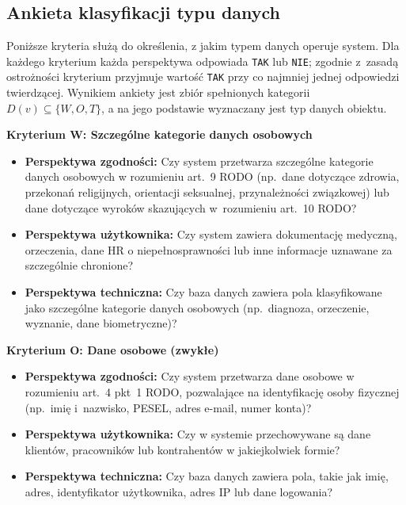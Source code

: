 \subsection{Ankieta klasyfikacji typu danych}

Poniższe kryteria służą do określenia, z jakim typem danych operuje system. Dla każdego kryterium każda perspektywa odpowiada \texttt{TAK} lub \texttt{NIE}; zgodnie z~zasadą ostrożności kryterium przyjmuje wartość \texttt{TAK} przy co najmniej jednej odpowiedzi twierdzącej. Wynikiem ankiety jest zbiór spełnionych kategorii $D(v) \subseteq \{W, O, T\}$, a na jego podstawie wyznaczany jest typ danych obiektu.

\bigskip
\noindent\textbf{Kryterium W: Szczególne kategorie danych osobowych}
\begin{itemize}
    \item \textbf{Perspektywa zgodności:} Czy system przetwarza
    szczególne kategorie danych osobowych w rozumieniu art.~9 RODO
    (np.\ dane dotyczące zdrowia, przekonań religijnych, orientacji
    seksualnej, przynależności związkowej) lub dane dotyczące
    wyroków skazujących w~rozumieniu art.~10 RODO?
    \item \textbf{Perspektywa użytkownika:} Czy system zawiera
    dokumentację medyczną, orzeczenia, dane HR
    o niepełnosprawności lub inne informacje uznawane
    za szczególnie chronione?
    \item \textbf{Perspektywa techniczna:} Czy baza danych zawiera
    pola klasyfikowane jako szczególne kategorie danych osobowych (np.\ diagnoza,
    orzeczenie, wyznanie, dane biometryczne)?
\end{itemize}

\bigskip
\noindent\textbf{Kryterium O: Dane osobowe (zwykłe)}
\begin{itemize}
    \item \textbf{Perspektywa zgodności:} Czy system przetwarza
    dane osobowe w rozumieniu art.~4 pkt~1 RODO,
    pozwalające na identyfikację osoby fizycznej
    (np.\ imię i~nazwisko, PESEL, adres e-mail, numer konta)?
    \item \textbf{Perspektywa użytkownika:} Czy w systemie
    przechowywane są dane klientów, pracowników
    lub kontrahentów w jakiejkolwiek formie?
    \item \textbf{Perspektywa techniczna:} Czy baza danych zawiera
    pola, takie jak imię, adres, identyfikator użytkownika, adres IP lub dane logowania?
\end{itemize}


